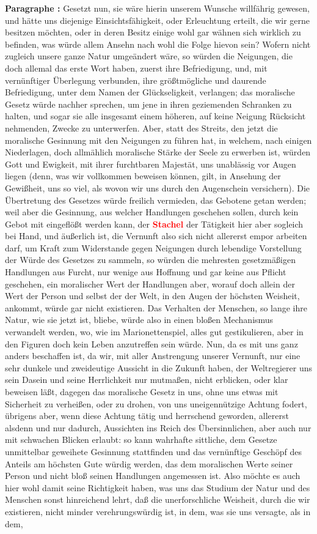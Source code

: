 \documentclass[a4paper,12pt,twoside]{book}
\newcommand{\match}[1]{\textcolor{red}{\textbf{#1}}}
\begin{document}
	\textbf{Paragraphe : }Gesetzt nun, sie wäre hierin unserem Wunsche willfährig gewesen, und hätte uns diejenige Einsichtsfähigkeit, oder Erleuchtung erteilt, die wir gerne besitzen möchten, oder in deren Besitz einige wohl gar wähnen sich wirklich zu befinden, was würde allem Ansehn nach wohl die Folge hievon sein? Wofern nicht zugleich unsere ganze Natur umgeändert wäre, so würden die Neigungen, die doch allemal das erste Wort haben, zuerst ihre Befriedigung, und, mit vernünftiger Überlegung verbunden, ihre größtmögliche und daurende Befriedigung, unter dem Namen der Glückseligkeit, verlangen; das moralische Gesetz würde nachher sprechen, um jene in ihren geziemenden Schranken zu halten, und sogar sie alle insgesamt einem höheren, auf keine Neigung Rücksicht nehmenden, Zwecke zu unterwerfen.  Aber, statt des Streits, den jetzt die moralische Gesinnung mit den Neigungen zu führen hat, in welchem, nach einigen Niederlagen, doch allmählich moralische Stärke der Seele zu erwerben ist, würden Gott und Ewigkeit, mit ihrer furchtbaren Majestät, uns unablässig vor Augen liegen (denn, was wir vollkommen beweisen können, gilt, in Ansehung der Gewißheit, uns so viel, als wovon wir uns durch den Augenschein versichern). Die Übertretung des Gesetzes würde freilich vermieden, das Gebotene getan werden; weil aber die Gesinnung, aus welcher Handlungen geschehen sollen, durch kein Gebot mit eingeflößt werden kann, der \match{Stachel} der Tätigkeit hier aber sogleich bei Hand, und äußerlich ist, die Vernunft also sich nicht allererst empor arbeiten darf, um Kraft zum Widerstande gegen Neigungen durch lebendige Vorstellung der Würde des Gesetzes zu sammeln, so würden die mehresten gesetzmäßigen Handlungen aus Furcht, nur wenige aus Hoffnung und gar keine aus Pflicht geschehen, ein moralischer Wert der Handlungen aber, worauf doch allein der Wert der Person und selbst der der Welt, in den Augen der höchsten Weisheit, ankommt, würde gar nicht existieren. Das Verhalten der Menschen, so lange ihre Natur, wie sie jetzt ist, bliebe, würde also in einen bloßen Mechanismus verwandelt werden, wo, wie im Marionettenspiel, alles gut gestikulieren, aber in den Figuren doch kein Leben anzutreffen sein würde. Nun, da es mit uns ganz anders beschaffen ist, da wir, mit aller Anstrengung unserer Vernunft, nur eine sehr dunkele und zweideutige Aussicht in die Zukunft haben, der Weltregierer uns sein Dasein und seine Herrlichkeit nur mutmaßen, nicht erblicken, oder klar beweisen läßt, dagegen das moralische Gesetz in uns, ohne uns etwas mit Sicherheit zu verheißen, oder zu drohen, von uns uneigennützige Achtung fodert, übrigens aber, wenn diese Achtung tätig und herrschend geworden, allererst alsdenn und nur dadurch, Aussichten ins Reich des Übersinnlichen, aber auch nur mit schwachen Blicken erlaubt: so kann wahrhafte sittliche, dem Gesetze unmittelbar geweihete Gesinnung stattfinden und das vernünftige Geschöpf des Anteils am höchsten Gute würdig  werden, das dem moralischen Werte seiner Person und nicht bloß seinen Handlungen angemessen ist. Also möchte es auch hier wohl damit seine Richtigkeit haben, was uns das Studium der Natur und des Menschen sonst hinreichend lehrt, daß die unerforschliche Weisheit, durch die wir existieren, nicht minder verehrungswürdig ist, in dem, was sie uns versagte, als in dem, 
\end{document}
